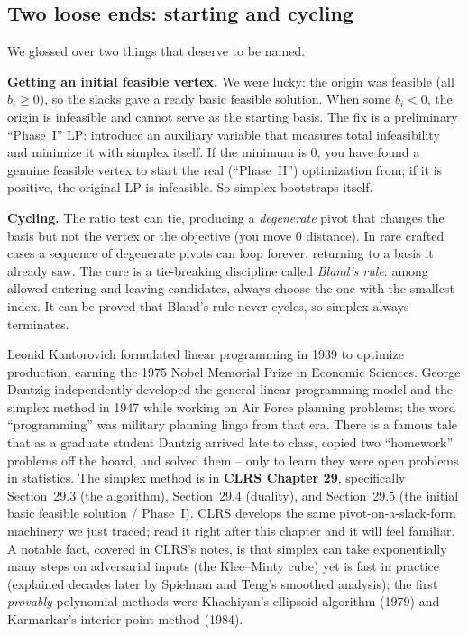 \subsection{Two loose ends: starting and cycling}

We glossed over two things that deserve to be named.

\textbf{Getting an initial feasible vertex.} We were lucky: the origin was
feasible (all $b_i \ge 0$), so the slacks gave a ready basic feasible solution.
When some $b_i < 0$, the origin is infeasible and cannot serve as the starting basis.
The fix is a preliminary ``Phase~I'' LP: introduce an auxiliary variable that
measures total infeasibility and minimize it with simplex itself. If the
minimum is 0, you have found a genuine feasible vertex to start the real
(``Phase~II'') optimization from; if it is positive, the original LP is
infeasible. So simplex bootstraps itself.

\textbf{Cycling.} The ratio test can tie, producing a \emph{degenerate} pivot
that changes the basis but not the vertex or the objective (you move 0
distance). In rare crafted cases a sequence of degenerate pivots can loop
forever, returning to a basis it already saw. The cure is a tie-breaking
discipline called \emph{Bland's rule}: among allowed entering and leaving
candidates, always choose the one with the smallest index. It can be proved
that Bland's rule never cycles, so simplex always terminates.

\begin{historybox}
Leonid Kantorovich formulated linear programming in 1939 to optimize production, earning the 1975 Nobel Memorial Prize in Economic Sciences. George Dantzig independently developed the general linear programming model and the simplex method in 1947 while working on Air Force planning problems; the word ``programming'' was military planning lingo from that era. There is a famous tale that as a graduate student Dantzig arrived late to class, copied two ``homework'' problems off the board, and solved them -- only to learn they were open problems in statistics. The simplex method is in \textbf{CLRS Chapter 29}, specifically Section~29.3 (the algorithm), Section~29.4 (duality), and Section~29.5 (the initial basic feasible solution / Phase~I). CLRS develops the same pivot-on-a-slack-form machinery we just traced; read it right after this chapter and it will feel familiar. A notable fact, covered in CLRS's notes, is that simplex can take exponentially many steps on adversarial inputs (the Klee--Minty cube) yet is fast in practice (explained decades later by Spielman and Teng's smoothed analysis); the first \emph{provably} polynomial methods were Khachiyan's ellipsoid algorithm (1979) and Karmarkar's interior-point method (1984).
\end{historybox}

